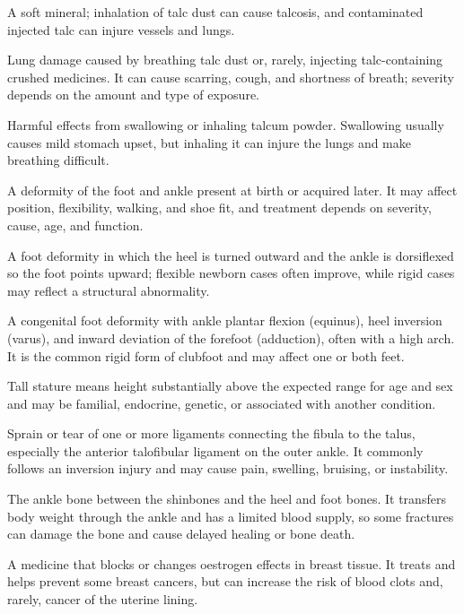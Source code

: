  A soft mineral; inhalation of talc dust can cause talcosis, and contaminated injected talc can injure vessels and lungs.

 Lung damage caused by breathing talc dust or, rarely, injecting talc-containing crushed medicines. It can cause scarring, cough, and shortness of breath; severity depends on the amount and type of exposure.

 Harmful effects from swallowing or inhaling talcum powder. Swallowing usually causes mild stomach upset, but inhaling it can injure the lungs and make breathing difficult.

 A deformity of the foot and ankle present at birth or acquired later. It may affect position, flexibility, walking, and shoe fit, and treatment depends on severity, cause, age, and function.

 A foot deformity in which the heel is turned outward and the ankle is dorsiflexed so the foot points upward; flexible newborn cases often improve, while rigid cases may reflect a structural abnormality.

 A congenital foot deformity with ankle plantar flexion
(equinus), heel inversion (varus), and inward deviation of the forefoot (adduction),
often with a high arch. It is the common rigid form of clubfoot and may affect one or
both feet.

 Tall stature means height substantially above the expected range for age and sex and may be familial, endocrine, genetic, or associated with another condition.

 Sprain or tear of one or more ligaments connecting the fibula to the talus, especially the anterior talofibular ligament on the outer ankle. It commonly follows an inversion injury and may cause pain, swelling, bruising, or instability.

 The ankle bone between the shinbones and the heel and foot bones. It transfers body weight through the ankle and has a limited blood supply, so some fractures can damage the bone and cause delayed healing or bone death.

 A medicine that blocks or changes oestrogen effects in breast tissue. It treats and helps prevent some breast cancers, but can increase the risk of blood clots and, rarely, cancer of the uterine lining.

